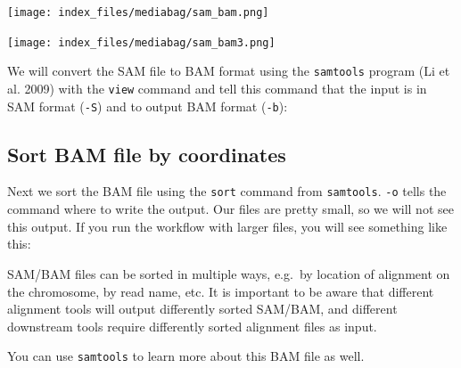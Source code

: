 \documentclass[
  letterpaper,
  DIV=11,
  numbers=noendperiod]{scrreprt}
\newenvironment{Shaded}{\begin{snugshade}}{\end{snugshade}}
\newcommand{\AttributeTok}[1]{\textcolor[rgb]{0.40,0.45,0.13}{#1}}
\newcommand{\ExtensionTok}[1]{\textcolor[rgb]{0.00,0.23,0.31}{#1}}
\newcommand{\NormalTok}[1]{\textcolor[rgb]{0.00,0.23,0.31}{#1}}
\newcommand{\OperatorTok}[1]{\textcolor[rgb]{0.37,0.37,0.37}{#1}}
\begin{document}
\texttt{[image: index\_files/mediabag/sam\_bam.png]}

\texttt{[image: index\_files/mediabag/sam\_bam3.png]}

We will convert the SAM file to BAM format using the \texttt{samtools}
program (Li et al. 2009) with the \texttt{view} command and tell this
command that the input is in SAM format (\texttt{-S}) and to output BAM
format (\texttt{-b}):

\begin{Shaded}
\end{Shaded}

\hypertarget{sort-bam-file-by-coordinates}{%
\subsection{Sort BAM file by
coordinates}\label{sort-bam-file-by-coordinates}}

Next we sort the BAM file using the \texttt{sort} command from
\texttt{samtools}. \texttt{-o} tells the command where to write the
output. Our files are pretty small, so we will not see this output. If
you run the workflow with larger files, you will see something like
this:

\begin{Shaded}
\end{Shaded}

SAM/BAM files can be sorted in multiple ways, e.g.~by location of
alignment on the chromosome, by read name, etc. It is important to be
aware that different alignment tools will output differently sorted
SAM/BAM, and different downstream tools require differently sorted
alignment files as input.

You can use \texttt{samtools} to learn more about this BAM file as well.
\end{document}
